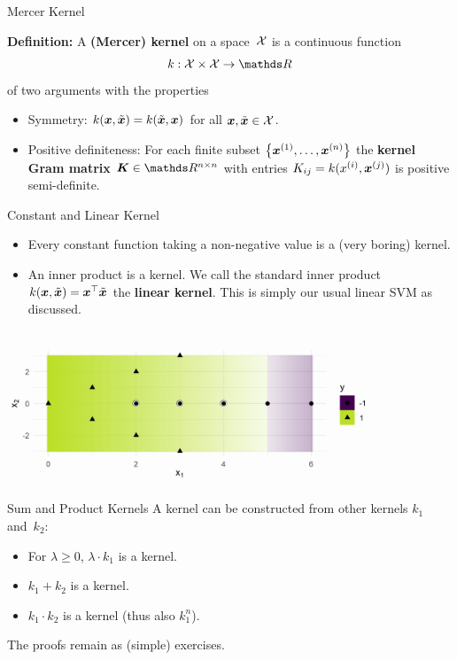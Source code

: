 \begin{vbframe}{Mercer Kernel}


  \textbf{Definition:} A \textbf{(Mercer) kernel} on a space~$\mathcal{X}$ is a
  continuous function
  $$ k : \Xspace \times \Xspace \to \R $$
  of two arguments with the properties
  \begin{itemize}
    \item Symmetry: $k(\bm{x}, \tilde {\bm{x}}) = k(\tilde {\bm{x}}, \bm{x})$ for all
    $\bm{x}, \tilde {\bm{x}} \in \mathcal{X}$.
    \item Positive definiteness: For each finite subset $\left\{\bm{x}^{(1)}, \dots, \bm{x}^{(n)}\right\}$
    the \textbf{kernel Gram matrix} $\bm{K} \in \R^{n \times n}$ with entries
    $K_{ij} = k(x^{(i)}, \bm{x}^{(j)})$ is positive semi-definite.
  \end{itemize}

\end{vbframe}

\begin{vbframe}{Constant and Linear Kernel}

  \begin{itemize}
    \item Every constant function taking a non-negative value is a
    (very boring) kernel.
    \item An inner product is a kernel.
    We call the standard inner product $k(\bm{x}, \tilde {\bm{x}}) = \bm{x}^\top \tilde {\bm{x}}$
    the \textbf{linear kernel}. This is simply our usual linear SVM as discussed.
  \end{itemize}
  

\begin{center}
\includegraphics[width = 11cm ]{figure/svm_linear_kernel.png}
\end{center}

\end{vbframe}

\begin{vbframe}{Sum and Product Kernels}
    A kernel can be constructed from other kernels $k_1$ and~$k_2$:
  \begin{itemize}
      \item For $\lambda \geq 0$, $\lambda \cdot k_1$ is a kernel.
      \item $k_1 + k_2$ is a kernel.
      \item $k_1 \cdot k_2$ is a kernel (thus also $k_1^n$).
    \end{itemize}
    
    \lz

    The proofs remain as (simple) exercises.
\end{vbframe}

